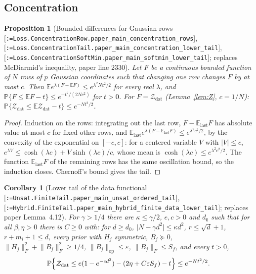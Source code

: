 \documentclass[11pt]{article}
\makeatletter
\newcommand{\formal@break}[1]{\@tfor\formal@tok:=#1\do{%
  \formal@tok
  \expandafter\ifx\formal@tok.\allowbreak\else
  \expandafter\ifx\formal@tok\_\allowbreak\fi\fi}}
\DeclareRobustCommand{\formal}[1]{\textnormal{[\texttt{\small\formal@break{#1}}]}}
\newcommand{\E}{\mathbb{E}}
\newcommand{\Prob}{\mathbb{P}}
\newcommand{\norm}[1]{\lVert #1\rVert}
\newcommand{\abs}[1]{\lvert #1\rvert}
\newcommand{\op}{\mathrm{op}}
\newcommand{\Fro}{F}
\newcommand{\sqd}{\sqrt{d}}
\theoremstyle{plain}
\newtheorem{proposition}[theorem]{Proposition}
\newtheorem{corollary}[theorem]{Corollary}
\theoremstyle{definition}
\makeatother
\begin{document}
\subsection{Concentration}\label{sec:concentration}

\begin{proposition}[Bounded differences for Gaussian rows \formal{Loss.ConcentrationRow.paper\_main\_concentration\_rows}, \formal{Loss.ConcentrationTail.paper\_main\_concentration\_lower\_tail}, \formal{Loss.ConcentrationSoftMin.paper\_main\_softmin\_lower\_tail}; replaces McDiarmid's inequality, paper line 2330]\label{prop:bdd}
Let $F$ be a continuous bounded function of $N$ rows of $p$ Gaussian
coordinates such that changing one row changes $F$ by at most $c$. Then
$\E e^{\lambda(F - \E F)} \le e^{\lambda^2Nc^2/2}$ for every real $\lambda$, and
$\Prob\{F \le \E F - t\} \le e^{-t^2/(2Nc^2)}$ for $t > 0$. For
$F = \mathcal{Z}_{\mathrm{dat}}$ (Lemma~\ref{lem:Z}, $c = 1/N$):
$\Prob\{\mathcal{Z}_{\mathrm{dat}} \le \E\mathcal{Z}_{\mathrm{dat}} - t\} \le e^{-Nt^2/2}$.
\end{proposition}

\begin{proof}
Induction on the rows: integrating out the last row, $F - \E_{\text{last}}F$
has absolute value at most $c$ for fixed other rows, and
$\E_{\text{last}}e^{\lambda(F - \E_{\text{last}}F)} \le e^{\lambda^2c^2/2}$,
by the convexity of the exponential on $[-c, c]$: for a centered variable
$V$ with $\abs{V} \le c$, $e^{\lambda V} \le \cosh(\lambda c) + V\sinh(\lambda c)/c$,
whose mean is $\cosh(\lambda c) \le e^{\lambda^2c^2/2}$. The function
$\E_{\text{last}}F$ of the remaining rows has the same oscillation bound,
so the induction closes. Chernoff's bound gives the tail.
\end{proof}

\begin{corollary}[Lower tail of the data functional \formal{Unsat.FiniteTail.paper\_main\_unsat\_ordered\_tail}, \formal{Hybrid.FiniteTail.paper\_main\_hybrid\_finite\_data\_lower\_tail}; replaces paper Lemma~4.12]\label{cor:tail}
For $\gamma > 1/4$ there are $\kappa \le \gamma/2$, $e, c > 0$ and $d_0$ such
that for all $\beta, \eta > 0$ there is $C \ge 0$ with: for $d \ge d_0$,
$\abs{N - \gamma d^2} \le \kappa d^2$, $r \le \sqd + 1$, $r + m_i + 1 \le d$, every
prior with $H_j$ symmetric, $B_j \succeq 0$, $\norm{H_j}_\Fro^2 + \norm{B_j}_\Fro^2 \ge 1/4$,
$\norm{B_j}_\op \le \varepsilon$, $\norm{B_j}_\Fro \le S_f$, and every $t > 0$,
\[
\Prob\Bigl\{\mathcal{Z}_{\mathrm{dat}} \le e(1 - e^{-cd^2}) - (2\eta + C\varepsilon S_f) - t\Bigr\} \le e^{-Nt^2/2}.
\]
\end{corollary}
\end{document}
